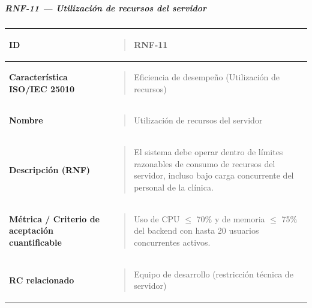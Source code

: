 \documentclass[
]{article}
\newcounter{none} %
\begin{document}
\subparagraph{RNF-11 --- Utilización de recursos del
servidor}\label{rnf-11-utilizacion-de-recursos-del-servidor}

{\def\LTcaptype{none} %
\begin{longtable}[]{@{}
  >{\raggedright\arraybackslash}p{}
  >{\raggedright\arraybackslash}p{}@{}}
\toprule\noalign{}
\begin{minipage}[b]{\linewidth}\raggedright
\textbf{ID}
\end{minipage} & \begin{minipage}[b]{\linewidth}\raggedright
\begin{quote}
RNF-11
\end{quote}
\end{minipage} \\
\midrule\noalign{}
\endhead
\bottomrule\noalign{}
\endlastfoot
\textbf{Característica ISO/IEC 25010} & \begin{minipage}[t]{\linewidth}\raggedright
\begin{quote}
Eficiencia de desempeño (Utilización de recursos)
\end{quote}
\end{minipage} \\
\textbf{Nombre} & \begin{minipage}[t]{\linewidth}\raggedright
\begin{quote}
Utilización de recursos del servidor
\end{quote}
\end{minipage} \\
\textbf{Descripción (RNF)} & \begin{minipage}[t]{\linewidth}\raggedright
\begin{quote}
El sistema debe operar dentro de límites razonables de consumo de
recursos del servidor, incluso bajo carga concurrente del personal de
la clínica.
\end{quote}
\end{minipage} \\
\textbf{Métrica / Criterio de aceptación cuantificable} & \begin{minipage}[t]{\linewidth}\raggedright
\begin{quote}
Uso de CPU \(\leq\) 70\% y de memoria \(\leq\) 75\% del backend con
hasta 20 usuarios concurrentes activos.
\end{quote}
\end{minipage} \\
\textbf{RC relacionado} & \begin{minipage}[t]{\linewidth}\raggedright
\begin{quote}
Equipo de desarrollo (restricción técnica de servidor)
\end{quote}
\end{minipage} \\
\end{longtable}
}
\end{document}
